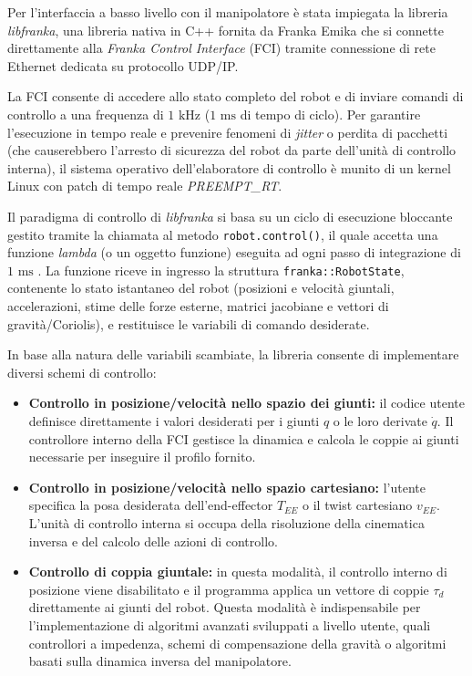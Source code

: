 Per l'interfaccia a basso livello con il manipolatore è stata impiegata la libreria \textit{libfranka}, una libreria nativa in C++ fornita da Franka Emika che si connette direttamente alla \textit{Franka Control Interface} (FCI) tramite connessione di rete Ethernet dedicata su protocollo UDP/IP. 

La FCI consente di accedere allo stato completo del robot e di inviare comandi di controllo a una frequenza di $1\text{ kHz}$ ($1\text{ ms}$ di tempo di ciclo). Per garantire l'esecuzione in tempo reale e prevenire fenomeni di \textit{jitter} o perdita di pacchetti (che causerebbero l'arresto di sicurezza del robot da parte dell'unità di controllo interna), il sistema operativo dell'elaboratore di controllo è munito di un kernel Linux con patch di tempo reale \textit{PREEMPT\_RT}.

Il paradigma di controllo di \textit{libfranka} si basa su un ciclo di esecuzione bloccante gestito tramite la chiamata al metodo \texttt{robot.control()}, il quale accetta una funzione \textit{lambda} (o un oggetto funzione) eseguita ad ogni passo di integrazione di $1\text{ ms}$ \cite{libfranka}. La funzione riceve in ingresso la struttura \texttt{franka::RobotState}, contenente lo stato istantaneo del robot (posizioni e velocità giuntali, accelerazioni, stime delle forze esterne, matrici jacobiane e vettori di gravità/Coriolis), e restituisce le variabili di comando desiderate.

In base alla natura delle variabili scambiate, la libreria consente di implementare diversi schemi di controllo:

\begin{itemize}
    \item \textbf{Controllo in posizione/velocità nello spazio dei giunti:} il codice utente definisce direttamente i valori desiderati per i giunti $q$ o le loro derivate $\dot{q}$. Il controllore interno della FCI gestisce la dinamica e calcola le coppie ai giunti necessarie per inseguire il profilo fornito.
    
    \item \textbf{Controllo in posizione/velocità nello spazio cartesiano:} l'utente specifica la posa desiderata dell'end-effector $T_{EE}$ o il twist cartesiano $v_{EE}$. L'unità di controllo interna si occupa della risoluzione della cinematica inversa e del calcolo delle azioni di controllo.
    
    \item \textbf{Controllo di coppia giuntale:} in questa modalità, il controllo interno di posizione viene disabilitato e il programma applica un vettore di coppie $\tau_{d}$ direttamente ai giunti del robot. Questa modalità è indispensabile per l'implementazione di algoritmi avanzati sviluppati a livello utente, quali controllori a impedenza, schemi di compensazione della gravità o algoritmi basati sulla dinamica inversa del manipolatore.
\end{itemize}

